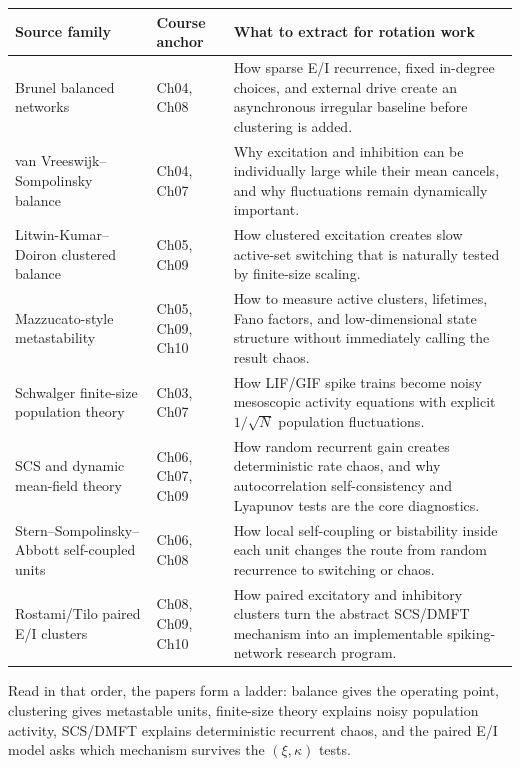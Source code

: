 \begin{center}
\renewcommand{\arraystretch}{1.35}
\begin{tabularx}{\textwidth}{@{}p{}p{}X@{}}
  \toprule
  \textbf{Source family} & \textbf{Course anchor} & \textbf{What to extract for rotation work} \\
  \midrule
  Brunel balanced networks & Ch04, Ch08 & How sparse E/I recurrence, fixed in-degree choices, and external drive create an asynchronous irregular baseline before clustering is added. \\
  van Vreeswijk--Sompolinsky balance & Ch04, Ch07 & Why excitation and inhibition can be individually large while their mean cancels, and why fluctuations remain dynamically important. \\
  Litwin-Kumar--Doiron clustered balance & Ch05, Ch09 & How clustered excitation creates slow active-set switching that is naturally tested by finite-size scaling. \\
  Mazzucato-style metastability & Ch05, Ch09, Ch10 & How to measure active clusters, lifetimes, Fano factors, and low-dimensional state structure without immediately calling the result chaos. \\
  Schwalger finite-size population theory & Ch03, Ch07 & How LIF/GIF spike trains become noisy mesoscopic activity equations with explicit \(1/\sqrt{N}\) population fluctuations. \\
  SCS and dynamic mean-field theory & Ch06, Ch07, Ch09 & How random recurrent gain creates deterministic rate chaos, and why autocorrelation self-consistency and Lyapunov tests are the core diagnostics. \\
  Stern--Sompolinsky--Abbott self-coupled units & Ch06, Ch08 & How local self-coupling or bistability inside each unit changes the route from random recurrence to switching or chaos. \\
  Rostami/Tilo paired E/I clusters & Ch08, Ch09, Ch10 & How paired excitatory and inhibitory clusters turn the abstract SCS/DMFT mechanism into an implementable spiking-network research program. \\
  \bottomrule
\end{tabularx}
\end{center}

Read in that order, the papers form a ladder: balance gives the operating
point, clustering gives metastable units, finite-size theory explains noisy
population activity, SCS/DMFT explains deterministic recurrent chaos, and the
paired E/I model asks which mechanism survives the \((\xi,\kappa)\) tests.

